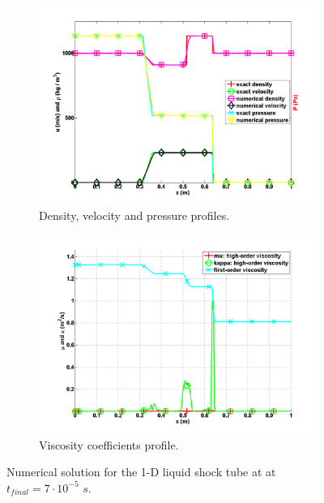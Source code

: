 \documentclass[preprint,10pt]{elsarticle}
\begin{document}
\begin{figure}[H]
        \centering
        \begin{subfigure}[b]{0.495\textwidth}
                \centering
                \includegraphics[width=\textwidth]{LiquidSrongShock_density_velocity_pressure_profiles.png}
                \caption{Density, velocity and pressure profiles.}
                \label{fig:1d_strong_shock_var}
        \end{subfigure}%
        \begin{subfigure}[b]{0.495\textwidth}
                \centering
                \includegraphics[width=\textwidth]{LiquidSrongShock_viscosity.png}
                \caption{Viscosity coefficients profile.}
                \label{fig:1d_strong_shock_visc}
        \end{subfigure}
        \caption{Numerical solution for the 1-D liquid shock tube at  at $t_{final} = 7 \cdot 10^{-5}$ $s$.}\label{fig:1d_strong_shock}
\end{figure}
\end{document}
